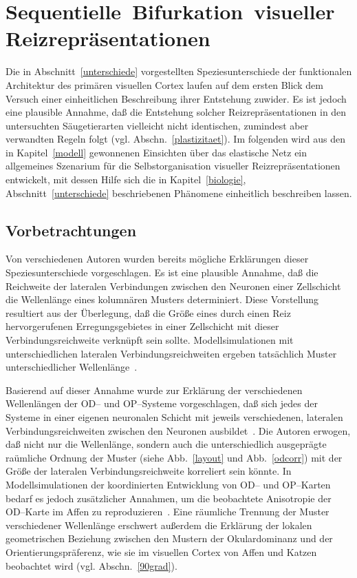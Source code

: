 \section{\mbox{Sequentielle}~\mbox{Bifurkation}~\mbox{visueller}~\mbox{Reizrepräsentationen}}
\label{main}
\thispagestyle{plain}
\setcounter{footnote}{1}

Die in Abschnitt~\ref{unterschiede} vorgestellten Speziesunterschiede der
funktionalen Architektur des primären visuellen Cortex laufen auf dem
ersten Blick dem Versuch einer einheitlichen Beschreibung ihrer Entstehung
zuwider. Es ist jedoch eine plausible Annahme, daß die Entstehung solcher
Reizrepräsentationen in den untersuchten Säugetierarten vielleicht nicht
identischen, zumindest aber verwandten Regeln folgt
(vgl. Abschn.~\ref{plastizitaet}). Im folgenden wird aus den in
Kapitel~\ref{modell} gewonnenen Einsichten über das elastische Netz ein
allgemeines Szenarium für die Selbstorganisation visueller
Reizrepräsentationen entwickelt, mit dessen Hilfe sich die in
Kapitel~\ref{biologie}, Abschnitt~\ref{unterschiede} beschriebenen
Phänomene einheitlich beschreiben lassen.

\subsection{Vorbetrachtungen}

Von verschiedenen Autoren wurden bereits mögliche Erklärungen dieser
Speziesunterschiede vorgeschlagen. Es ist eine plausible Annahme, daß die
Reichweite der lateralen Verbindungen zwischen den Neuronen einer
Zellschicht die Wellenlänge eines kolumnären Musters determiniert. Diese
Vorstellung resultiert aus der Überlegung, daß die Größe eines durch
einen Reiz hervorgerufenen Erregungsgebietes in einer Zellschicht mit
dieser Verbindungsreichweite verknüpft sein sollte. Modellsimulationen
mit unterschiedlichen lateralen Verbindungsreichweiten ergeben tatsächlich
Muster unterschiedlicher Wellenlänge~\cite{swindale:1992}.

Basierend auf dieser Annahme wurde zur Erklärung der verschiedenen
Wellenlängen der OD-- und OP--Systeme vorgeschlagen, daß sich jedes der
Systeme in einer eigenen neuronalen Schicht mit jeweils verschiedenen,
lateralen Verbindungsreichweiten zwischen den Neuronen ausbildet~\cite{loewel:1988}.
Die Autoren erwogen, daß nicht nur die Wellenlänge,
sondern auch die unterschiedlich ausgeprägte raümliche Ordnung der Muster
(siehe Abb.~\ref{layout} und Abb.~\ref{odcorr}) mit der Größe der
lateralen Verbindungsreichweite korreliert sein könnte. In
Modellsimulationen der koordinierten Entwicklung von OD-- und OP--Karten
bedarf es jedoch zusätzlicher Annahmen, um die beobachtete Anisotropie der
OD--Karte im Affen zu reproduzieren~\cite{swindale:1992}. Eine räumliche
Trennung der Muster verschiedener Wellenlänge erschwert außerdem die
Erklärung der lokalen geometrischen Beziehung zwischen den Mustern der
Okulardominanz und der Orientierungspräferenz, wie sie im visuellen Cortex
von Affen und Katzen beobachtet wird (vgl. Abschn.~\ref{90grad}).

